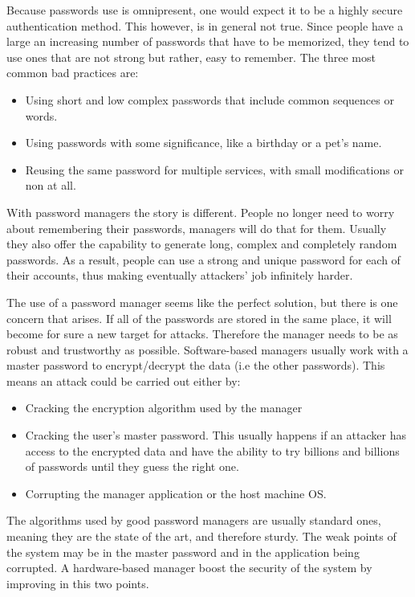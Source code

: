 Because passwords use is omnipresent, one would expect it to be a highly secure authentication method. This however, is in general not true. Since people have a large an increasing number of passwords that have to be memorized, they tend to use ones that are not strong but rather, easy to remember. The three most common bad practices are:
\begin{itemize}
\setlength\itemsep{-3pt}
\item Using short and low complex passwords that include common sequences or words.
\item Using passwords with some significance, like a birthday or a pet's name.
\item Reusing the same password for multiple services, with small modifications or non at all.
\end{itemize}

With password managers the story is different. People no longer need to worry about remembering their passwords, managers will do that for them. Usually they also offer the capability to generate long, complex and completely random passwords. As a result, people can use a strong and unique password for each of their accounts, thus making eventually attackers' job infinitely harder.

\vspace{15pt}

The use of a password manager seems like the perfect solution, but there is one concern that arises. If all of the passwords are stored in the same place, it will become for sure a new target for attacks. Therefore the manager needs to be as robust and trustworthy as possible. Software-based managers usually work with a master password to encrypt/decrypt the data (i.e the other passwords). This means an attack could be carried out either by:
\begin{itemize}
\setlength\itemsep{-3pt}
\item Cracking the encryption algorithm used by the manager
\item Cracking the user's master password. This usually happens if an attacker has access to the encrypted data and have the ability to try billions and billions of passwords until they guess the right one.
\item Corrupting the manager application or the host machine OS.
\end{itemize}

The algorithms used by good password managers are usually standard ones, meaning they are the state of the art, and therefore sturdy. The weak points of the system may be in the master password and in the application being corrupted. A hardware-based manager boost the security of the system by improving in this two points. 

